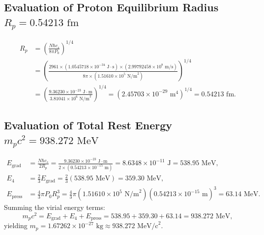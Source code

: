 \documentclass[11pt,a4paper]{article}
\begin{document}
	\subsection{Evaluation of Proton Equilibrium Radius $R_p = 0.54213\text{ fm}$}
	\begin{align}
		R_p &= \left( \frac{N \hbar c_s}{8\pi P_0} \right)^{1/4} \nonumber \\
		&= \left( \frac{2961 \times (1.0545718 \times 10^{-34} \text{ J}\cdot\text{s}) \times (2.99792458 \times 10^8 \text{ m/s})}{8\pi \times (1.51610 \times 10^5 \text{ N/m}^2)} \right)^{1/4} \nonumber \\
		&= \left( \frac{9.36230 \times 10^{-23} \text{ J}\cdot\text{m}}{3.81041 \times 10^6 \text{ N/m}^2} \right)^{1/4} = (2.45703 \times 10^{-29} \text{ m}^4)^{1/4} = 0.54213 \text{ fm}.
	\end{align}
	
	\subsection{Evaluation of Total Rest Energy $m_p c^2 = 938.272\text{ MeV}$}
	\begin{align}
		E_{\text{grad}} &= \frac{N \hbar c_s}{2 R_p} = \frac{9.36230 \times 10^{-23} \text{ J}\cdot\text{m}}{2 \times (0.54213 \times 10^{-15} \text{ m})} = 8.6348 \times 10^{-11} \text{ J} = 538.95 \text{ MeV}, \label{eq:E_grad_num} \\
		E_4 &= \frac{2}{3} E_{\text{grad}} = \frac{2}{3} (538.95 \text{ MeV}) = 359.30 \text{ MeV}, \label{eq:E4_num} \\
		E_{\text{press}} &= \frac{4}{3}\pi P_0 R_p^3 = \frac{4}{3}\pi (1.51610 \times 10^5 \text{ N/m}^2) (0.54213 \times 10^{-15} \text{ m})^3 = 63.14 \text{ MeV}. \label{eq:Epress_num}
	\end{align}
	Summing the virial energy terms:
	\begin{equation}
		m_p c^2 = E_{\text{grad}} + E_4 + E_{\text{press}} = 538.95 + 359.30 + 63.14 = 938.272 \text{ MeV},
	\end{equation}
	yielding $m_p = 1.67262 \times 10^{-27} \text{ kg} \approx 938.272 \text{ MeV/c}^2$.
	
\end{document}
